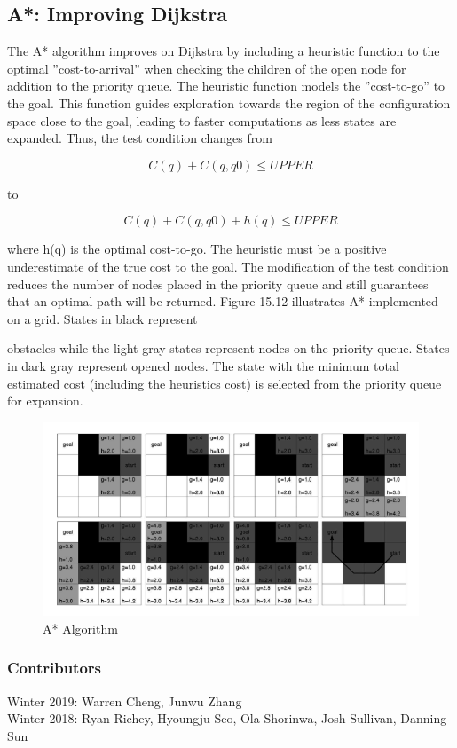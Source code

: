 \documentclass[twoside]{article}
\begin{document}
\subsection{A*: Improving Dijkstra}
The A* algorithm improves on Dijkstra by including a heuristic function to the optimal ”cost-to-arrival” when checking the children of the open node for addition to the priority queue. The heuristic function models the ”cost-to-go” to the goal. This function guides exploration towards the region of the configuration space close to the goal, leading to faster computations as less states are expanded. Thus, the test
condition changes from

\[ C(q) + C(q, q0) \leq UPPER \]

to

\[ C(q) + C(q, q0) + h(q) \leq UPPER \]

where h(q) is the optimal cost-to-go. The heuristic must be a positive underestimate of the true cost to the goal. The modification of the test condition reduces the number of nodes placed in the priority queue and still guarantees that an optimal path will be returned. Figure 15.12 illustrates A* implemented on a grid. States in black represent

obstacles while the light gray states represent nodes on the priority queue. States in dark gray represent opened nodes. The state with the minimum total estimated cost (including the heuristics cost) is selected from the priority queue for expansion.

\begin{figure}[h]
\begin{center}
\includegraphics[scale=0.90]{fig15_12.PNG}
\caption{A* Algorithm}
\end{center}
\end{figure}



\printbibliography

\subsubsection*{Contributors}
Winter 2019: Warren Cheng,  Junwu Zhang\\
Winter 2018: Ryan Richey, Hyoungju Seo, Ola Shorinwa, Josh Sullivan, Danning Sun
\end{document}

